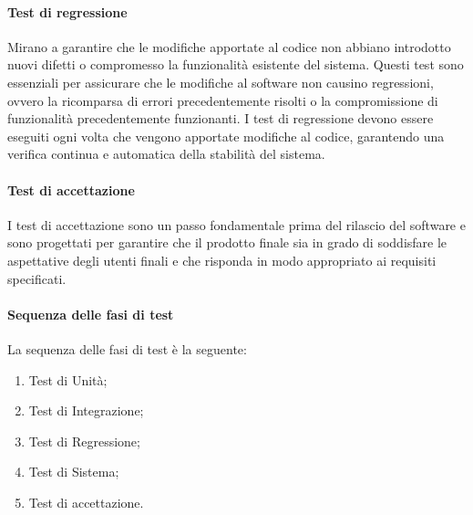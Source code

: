 \paragraph{Test di regressione}
Mirano a garantire che le modifiche apportate al codice non abbiano introdotto nuovi difetti o compromesso la funzionalità esistente del sistema. Questi test sono essenziali per assicurare che le modifiche al software non causino regressioni, ovvero la ricomparsa di errori precedentemente risolti o la compromissione di funzionalità precedentemente funzionanti.
I test di regressione devono essere eseguiti ogni volta che vengono apportate modifiche al codice, garantendo una verifica continua e automatica della stabilità del sistema.
\paragraph{Test di accettazione}
I test di accettazione sono un passo fondamentale prima del rilascio del software e sono progettati per garantire che il prodotto finale sia in grado di soddisfare le aspettative degli utenti finali e che risponda in modo appropriato ai requisiti specificati.

\paragraph*{Sequenza delle fasi di test}
La sequenza delle fasi di test è la seguente:
\begin{enumerate}
    \item Test di Unità;
    \item Test di Integrazione;
    \item Test di Regressione;
    \item Test di Sistema;
    \item Test di accettazione.
\end{enumerate}

